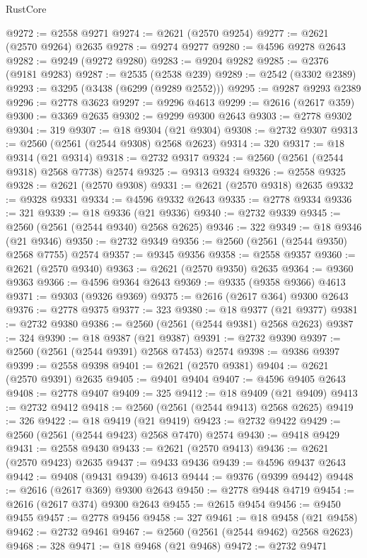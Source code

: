 \begin{lexlean}{RustCore}
\begin{coremodule}
@9272 := @2558 @9271
@9274 := @2621 (@2570 @9254)
@9277 := @2621 (@2570 @9264) @2635
@9278 := @9274 @9277
@9280 := @4596 @9278 @2643
@9282 := @9249 (@9272 @9280)
@9283 := @9204 @9282
@9285 := @2376 (@9181 @9283)
@9287 := @2535 (@2538 @239)
@9289 := @2542 (@3302 @2389)
@9293 := @3295 (@3438 (@6299 (@9289 @2552)))
@9295 := @9287 @9293 @2389
@9296 := @2778 @3623
@9297 := @9296 @4613
@9299 := @2616 (@2617 @359)
@9300 := @3369 @2635
@9302 := @9299 @9300 @2643
@9303 := @2778 @9302
@9304 := 319
@9307 := @18 @9304 (@21 @9304)
@9308 := @2732 @9307
@9313 := @2560 (@2561 (@2544 @9308) @2568 @2623)
@9314 := 320
@9317 := @18 @9314 (@21 @9314)
@9318 := @2732 @9317
@9324 := @2560 (@2561 (@2544 @9318) @2568 @7738) @2574
@9325 := @9313 @9324
@9326 := @2558 @9325
@9328 := @2621 (@2570 @9308)
@9331 := @2621 (@2570 @9318) @2635
@9332 := @9328 @9331
@9334 := @4596 @9332 @2643
@9335 := @2778 @9334
@9336 := 321
@9339 := @18 @9336 (@21 @9336)
@9340 := @2732 @9339
@9345 := @2560 (@2561 (@2544 @9340) @2568 @2625)
@9346 := 322
@9349 := @18 @9346 (@21 @9346)
@9350 := @2732 @9349
@9356 := @2560 (@2561 (@2544 @9350) @2568 @7755) @2574
@9357 := @9345 @9356
@9358 := @2558 @9357
@9360 := @2621 (@2570 @9340)
@9363 := @2621 (@2570 @9350) @2635
@9364 := @9360 @9363
@9366 := @4596 @9364 @2643
@9369 := @9335 (@9358 @9366) @4613
@9371 := @9303 (@9326 @9369)
@9375 := @2616 (@2617 @364) @9300 @2643
@9376 := @2778 @9375
@9377 := 323
@9380 := @18 @9377 (@21 @9377)
@9381 := @2732 @9380
@9386 := @2560 (@2561 (@2544 @9381) @2568 @2623)
@9387 := 324
@9390 := @18 @9387 (@21 @9387)
@9391 := @2732 @9390
@9397 := @2560 (@2561 (@2544 @9391) @2568 @7453) @2574
@9398 := @9386 @9397
@9399 := @2558 @9398
@9401 := @2621 (@2570 @9381)
@9404 := @2621 (@2570 @9391) @2635
@9405 := @9401 @9404
@9407 := @4596 @9405 @2643
@9408 := @2778 @9407
@9409 := 325
@9412 := @18 @9409 (@21 @9409)
@9413 := @2732 @9412
@9418 := @2560 (@2561 (@2544 @9413) @2568 @2625)
@9419 := 326
@9422 := @18 @9419 (@21 @9419)
@9423 := @2732 @9422
@9429 := @2560 (@2561 (@2544 @9423) @2568 @7470) @2574
@9430 := @9418 @9429
@9431 := @2558 @9430
@9433 := @2621 (@2570 @9413)
@9436 := @2621 (@2570 @9423) @2635
@9437 := @9433 @9436
@9439 := @4596 @9437 @2643
@9442 := @9408 (@9431 @9439) @4613
@9444 := @9376 (@9399 @9442)
@9448 := @2616 (@2617 @369) @9300 @2643
@9450 := @2778 @9448 @4719
@9454 := @2616 (@2617 @374) @9300 @2643
@9455 := @2615 @9454
@9456 := @9450 @9455
@9457 := @2778 @9456
@9458 := 327
@9461 := @18 @9458 (@21 @9458)
@9462 := @2732 @9461
@9467 := @2560 (@2561 (@2544 @9462) @2568 @2623)
@9468 := 328
@9471 := @18 @9468 (@21 @9468)
@9472 := @2732 @9471

\end{coremodule}
\end{lexlean}
